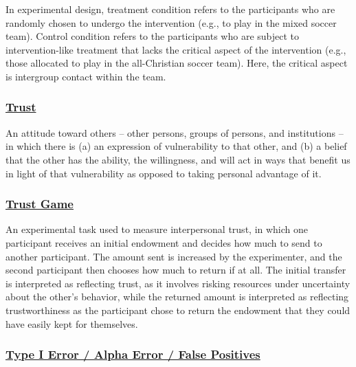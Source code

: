 \documentclass[
  letterpaper,
]{book}
\begin{document}
In experimental design, treatment condition refers to the participants
who are randomly chosen to undergo the intervention (e.g., to play in
the mixed soccer team). Control condition refers to the participants who
are subject to intervention-like treatment that lacks the critical
aspect of the intervention (e.g., those allocated to play in the
all-Christian soccer team). Here, the critical aspect is intergroup
contact within the team.

\subsubsection*{\texorpdfstring{\hyperref[def-trust]{Trust}}{Trust}}\label{trust-1}

An attitude toward others -- other persons, groups of persons, and
institutions -- in which there is (a) an expression of vulnerability to
that other, and (b) a belief that the other has the ability, the
willingness, and will act in ways that benefit us in light of that
vulnerability as opposed to taking personal advantage of it.

\subsubsection*{\texorpdfstring{\hyperref[def-trustgame]{Trust
Game}}{Trust Game}}\label{trust-game}

An experimental task used to measure interpersonal trust, in which one
participant receives an initial endowment and decides how much to send
to another participant. The amount sent is increased by the
experimenter, and the second participant then chooses how much to return
if at all. The initial transfer is interpreted as reflecting trust, as
it involves risking resources under uncertainty about the other's
behavior, while the returned amount is interpreted as reflecting
trustworthiness as the participant chose to return the endowment that
they could have easily kept for themselves.

\subsubsection*{\texorpdfstring{\hyperref[def-typeIerror]{Type I Error /
Alpha Error / False
Positives}}{Type I Error / Alpha Error / False Positives}}\label{type-i-error-alpha-error-false-positives}
\end{document}
